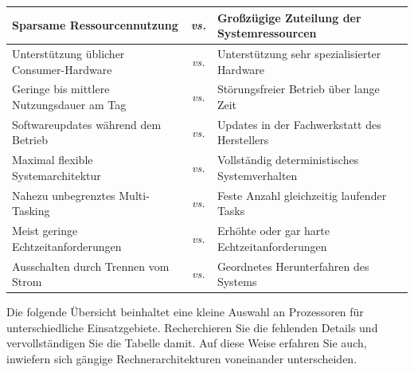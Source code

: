 \begin{longtable}{|p{} c p{}|}
    \hline
    Sparsame Ressourcennutzung
    & \textit{vs.} &
    Großzügige Zuteilung der Systemressourcen
    \\

    \hline
    Unterstützung üblicher Consumer-Hardware
    & \textit{vs.} &
    Unterstützung sehr spezialisierter Hardware
    \\

    \hline
    Geringe bis mittlere Nutzungsdauer am Tag
    & \textit{vs.} &
    Störungsfreier Betrieb über lange Zeit
    \\

    \hline
    Softwareupdates während dem Betrieb
    & \textit{vs.} &
    Updates in der Fachwerkstatt des Herstellers
    \\

    \hline
    Maximal flexible Systemarchitektur
    & \textit{vs.} &
    Vollständig deterministisches Systemverhalten
    \\

    \hline
    Nahezu unbegrenztes Multi-Tasking
    & \textit{vs.} &
    Feste Anzahl gleichzeitig laufender Tasks
    \\

    \hline
    Meist geringe Echtzeitanforderungen
    & \textit{vs.} &
    Erhöhte oder gar harte Echtzeitanforderungen
    \\

    \hline
    Ausschalten durch Trennen vom Strom
    & \textit{vs.} &
    Geordnetes Herunterfahren des Systems
    \\

    \hline
\end{longtable}

\teilaufgabe
Die folgende Übersicht beinhaltet eine kleine Auswahl an Prozessoren für
unterschiedliche Einsatzgebiete. Recherchieren Sie die fehlenden Details und
vervollständigen Sie die Tabelle damit. Auf diese Weise erfahren Sie auch,
inwiefern sich gängige Rechnerarchitekturen voneinander unterscheiden.

